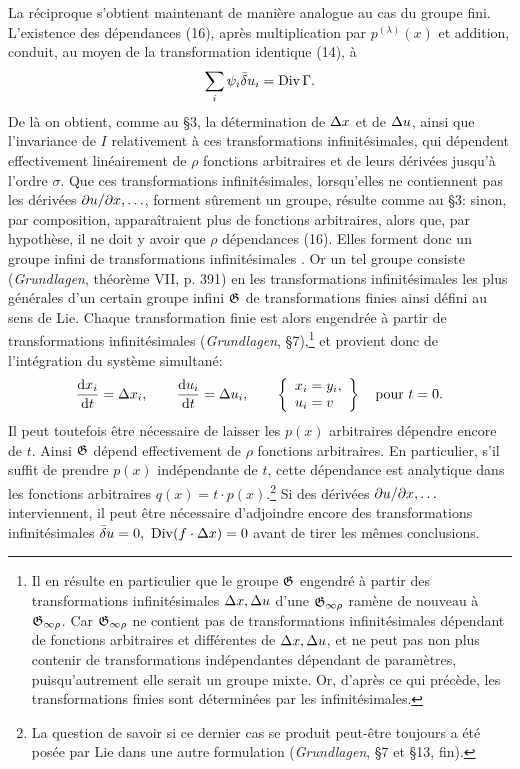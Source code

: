 La réciproque s'obtient maintenant de manière analogue au cas du groupe fini. L'existence des dépendances (16), après multiplication par \(p^{(\lambda)}(x)\) et addition, conduit, au moyen de la transformation identique (14), à
\[
\sum_i\psi_i\bar{\delta} u_i=\operatorname{Div}\Gamma.
\]
De là on obtient, comme au \S{}3, la détermination de \(\Delta x\) et de \(\Delta u\), ainsi que l'invariance de \(I\) relativement à ces transformations infinitésimales, qui dépendent effectivement linéairement de \(\rho\) fonctions arbitraires et de leurs dérivées jusqu'à l'ordre \(\sigma\). Que ces transformations infinitésimales, lorsqu'elles ne contiennent pas les dérivées \(\partial u/\partial x,\ldots\), forment sûrement un groupe, résulte comme au \S{}3: sinon, par composition, apparaîtraient plus de fonctions arbitraires, alors que, par hypothèse, il ne doit y avoir que \(\rho\) dépendances (16). Elles forment donc un \og groupe infini de transformations infinitésimales \fg{}. Or un tel groupe consiste (\emph{Grundlagen}, théorème VII, p. 391) en les transformations infinitésimales les plus générales d'un certain \og groupe infini \(\mathfrak G\) de transformations finies \fg{} ainsi défini au sens de Lie. Chaque transformation finie est alors engendrée à partir de transformations infinitésimales (\emph{Grundlagen}, \S{}7),\footnote{Il en résulte en particulier que le groupe \(\mathfrak G\) engendré à partir des transformations infinitésimales \(\Delta x,\Delta u\) d'une \(\mathfrak G_{\infty\rho}\) ramène de nouveau à \(\mathfrak G_{\infty\rho}\). Car \(\mathfrak G_{\infty\rho}\) ne contient pas de transformations infinitésimales dépendant de fonctions arbitraires et différentes de \(\Delta x,\Delta u\), et ne peut pas non plus contenir de transformations indépendantes dépendant de paramètres, puisqu'autrement elle serait un groupe mixte. Or, d'après ce qui précède, les transformations finies sont déterminées par les infinitésimales.} et provient donc de l'intégration du système simultané:
\[
\frac{\mathrm d x_i}{\mathrm d t}=\Delta x_i,\qquad
\frac{\mathrm d u_i}{\mathrm d t}=\Delta u_i,\qquad
\left\{\begin{array}{l}
x_i=y_i,\\
u_i=v
\end{array}\right\}
\quad\text{pour }t=0.
\]
Il peut toutefois être nécessaire de laisser les \(p(x)\) arbitraires dépendre encore de \(t\). Ainsi \(\mathfrak G\) dépend effectivement de \(\rho\) fonctions arbitraires. En particulier, s'il suffit de prendre \(p(x)\) indépendante de \(t\), cette dépendance est analytique dans les fonctions arbitraires \(q(x)=t\cdot p(x)\).\footnote{La question de savoir si ce dernier cas se produit peut-être toujours a été posée par Lie dans une autre formulation (\emph{Grundlagen}, \S{}7 et \S{}13, fin).} Si des dérivées \(\partial u/\partial x,\ldots\) interviennent, il peut être nécessaire d'adjoindre encore des transformations infinitésimales \(\bar{\delta} u=0,\ \operatorname{Div}(f\cdot\Delta x)=0\) avant de tirer les mêmes conclusions.


